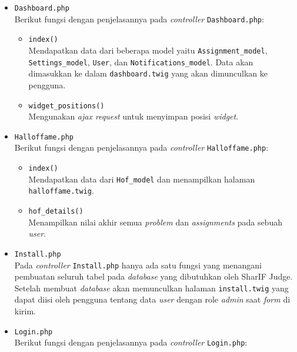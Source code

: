 \begin{itemize}
      \item \verb|Dashboard.php| \\
            Berikut fungsi dengan penjelasannya pada \textit{controller} \verb|Dashboard.php|:

            \begin{itemize}
                  \item \verb|index()| \\
                        Mendapatkan data dari beberapa model yaitu \verb|Assignment_model|, \verb|Settings_model|, \verb|User|, dan \verb|Notifications_model|. Data akan dimasukkan ke dalam \verb|dashboard.twig| yang akan dimunculkan ke pengguna.
                  \item \verb|widget_positions()| \\
                        Mengunakan \textit{ajax request} untuk menyimpan posisi \textit{widget}.
            \end{itemize}

      \item \verb|Halloffame.php| \\
            Berikut fungsi dengan penjelasannya pada \textit{controller} \verb|Halloffame.php|:

            \begin{itemize}
                  \item \verb|index()| \\
                        Mendapatkan data dari \verb|Hof_model| dan menampilkan halaman \verb|halloffame.twig|.
                  \item \verb|hof_details()| \\
                        Menampilkan nilai akhir semua \textit{problem} dan \textit{assignments} pada sebuah \textit{user}.
            \end{itemize}

      \item \verb|Install.php| \\
            Pada \textit{controller} \verb|Install.php| hanya ada satu fungsi yang menangani pembuatan seluruh tabel pada \textit{database} yang dibutuhkan oleh SharIF Judge. Setelah membuat \textit{database} akan memunculkan halaman \verb|install.twig| yang dapat diisi oleh pengguna tentang data \textit{user} dengan role \textit{admin} saat \textit{form} di kirim.

      \item \verb|Login.php| \\
            Berikut fungsi dengan penjelasannya pada \textit{controller} \verb|Login.php|:


\end{itemize}
